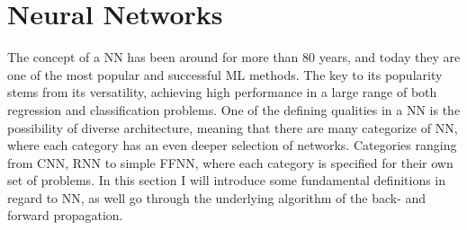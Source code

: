 \section{Neural Networks}\label{sec:NN}
The concept of a \ac{NN} has been around for more than 80 years, and today they are one 
of the most popular and successful \ac{ML} methods. The key to its popularity stems from
its versatility, achieving high performance in a large range of both regression 
and classification problems. One of the defining qualities in a \ac{NN} is the 
possibility of diverse architecture, meaning that there are many
categorize of \ac{NN}, where each category has an even deeper selection of
networks. Categories ranging from \ac{CNN}, \ac{RNN} to simple \ac{FFNN}, where each
category is specified for their own set of problems. In this section I will introduce 
some fundamental definitions in regard to \ac{NN}, as well go through the underlying 
algorithm of the back- and forward propagation.

